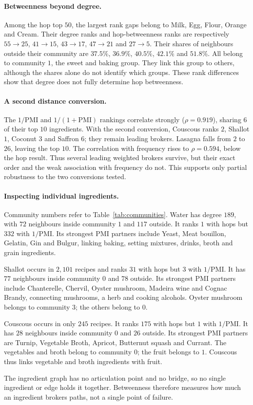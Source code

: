 \paragraph{Betweenness beyond degree.}
Among the hop top $50$, the largest rank gaps belong to Milk, Egg, Flour,
Orange and Cream. Their degree ranks and hop-betweenness ranks are respectively
$55\to25$, $41\to15$, $43\to17$, $47\to21$ and $27\to5$.
Their shares of neighbours outside their community are $37.5\%$, $36.9\%$,
$40.5\%$, $42.1\%$ and $51.8\%$. All belong to community $1$, the sweet
and baking group. They link this group to others, although the shares alone
do not identify which groups. These rank differences show that degree does
not fully determine hop betweenness.

\paragraph{A second distance conversion.}
The $1/\mathrm{PMI}$ and $1/(1+\mathrm{PMI})$ rankings correlate strongly
($\rho=0.919$), sharing $6$ of their top $10$ ingredients. With the second
conversion, Couscous ranks $2$, Shallot $1$, Coconut $3$ and Saffron $6$;
they remain leading brokers. Lasagna falls from $2$ to $26$, leaving the
top $10$. The correlation with frequency rises to $\rho=0.594$, below
the hop result. Thus several leading weighted brokers survive, but their
exact order and the weak association with frequency do not. This supports
only partial robustness to the two conversions tested.

\paragraph{Inspecting individual ingredients.}
Community numbers refer to Table~\ref{tab:communities}. Water has degree
$189$, with $72$ neighbours inside community $1$ and $117$ outside. It ranks
$1$ with hops but $332$ with $1/\mathrm{PMI}$. Its strongest PMI partners
include Yeast, Meat bouillon, Gelatin, Gin and Bulgur, linking baking,
setting mixtures, drinks, broth and grain ingredients.

Shallot occurs in $2{,}101$ recipes and ranks $31$ with hops but $3$ with
$1/\mathrm{PMI}$. It has $77$ neighbours inside community $0$ and $78$ outside. Its
strongest PMI partners include Chanterelle, Chervil, Oyster mushroom,
Madeira wine and Cognac Brandy, connecting mushrooms, a herb and cooking
alcohols. Oyster mushroom belongs to community $3$; the others belong to $0$.

Couscous occurs in only $245$ recipes. It ranks $175$ with hops but $1$
with $1/\mathrm{PMI}$. It has $28$ neighbours inside community $0$ and $26$
outside. Its strongest PMI partners are Turnip, Vegetable Broth, Apricot,
Butternut squash and Currant. The vegetables and broth belong to community
$0$; the fruit belongs to $1$. Couscous thus links vegetable and broth
ingredients with fruit.

The ingredient graph has no articulation point and no bridge, so no single
ingredient or edge holds it together. Betweenness therefore measures how
much an ingredient brokers paths, not a single point of failure.
